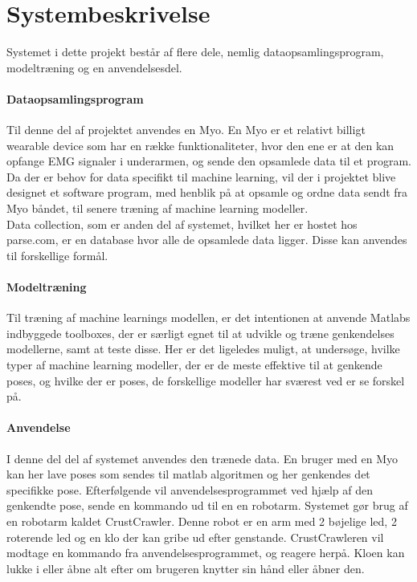 \thispagestyle{fancy}
\chapter{Systembeskrivelse}
\label{chp:systembeskrivelse}

Systemet i dette projekt består af flere dele, nemlig dataopsamlingsprogram, modeltræning og en anvendelsesdel.
\subsubsection{Dataopsamlingsprogram}
Til denne del af projektet anvendes en Myo. En Myo er et relativt billigt wearable device som har en række funktionaliteter, hvor den ene er at den kan opfange EMG signaler i underarmen, og sende den opsamlede data til et program.\\
Da der er behov for data specifikt til machine learning, vil der i projektet blive designet et software program, med henblik på at opsamle og ordne data sendt fra Myo båndet, til senere træning af machine learning modeller.\\
Data collection, som er anden del af systemet, hvilket her er hostet hos parse.com, er en database hvor alle de opsamlede data ligger. Disse kan anvendes til forskellige formål.

\subsubsection{Modeltræning}
Til træning af machine learnings modellen, er det intentionen at anvende Matlabs indbyggede toolboxes, der er særligt egnet til at udvikle og træne genkendelses modellerne, samt at teste disse. 
Her er det ligeledes muligt, at undersøge, hvilke typer af machine learning modeller, der er de meste effektive til at genkende poses, og hvilke der er poses, de forskellige modeller har sværest ved er se forskel på.

\subsubsection{Anvendelse}
I denne del del af systemet anvendes den trænede data. En bruger med en Myo kan her lave poses som sendes til matlab algoritmen og her genkendes det specifikke pose. Efterfølgende vil anvendelsesprogrammet ved hjælp af den genkendte pose, sende en kommando ud til en en robotarm. Systemet gør brug af en robotarm kaldet CrustCrawler. Denne robot er en arm med 2 bøjelige led, 2 roterende led og en klo der kan gribe ud efter genstande. CrustCrawleren vil modtage en kommando fra anvendelsesprogrammet, og reagere herpå. Kloen kan lukke i eller åbne alt efter om brugeren knytter sin hånd eller åbner den.\\


